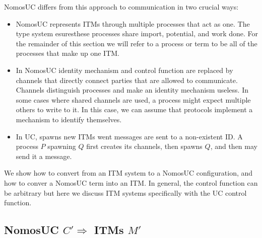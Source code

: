 NomosUC differs from this approach to communication in two crucial ways:
\begin{itemize}
	\item NomosUC represents ITMs through multiple processes that act as one. The type system esuresthese processes share import, potential, and work done. For the remainder of this section we will refer to a process or term to be all of the processes that make up one ITM. 
	\item In NomosUC identity mechanism and control function are replaced by channels that directly connect parties that are allowed to communicate. Channels distinguish processes and make an identity mechanism useless. 
		In some cases where shared channels are used, a process might expect multiple others to write to it. In this case, we can assume that protocols implement a mechanism to identify themselves.
	\item In UC, \cf spawns new ITMs went messages are sent to a non-existent ID. A process $P$ spawning $Q$ first creates its channels, then spawns $Q$, and then may send it a message.
\end{itemize}

We show how to convert from an ITM system to a NomosUC configuration, and how to conver a NomosUC term into an ITM. 
In general, the control function can be arbitrary but here we discuss ITM systems specifically with the UC control function.

\subsection{NomosUC $C' \Rightarrow$ ITMs $M'$}

